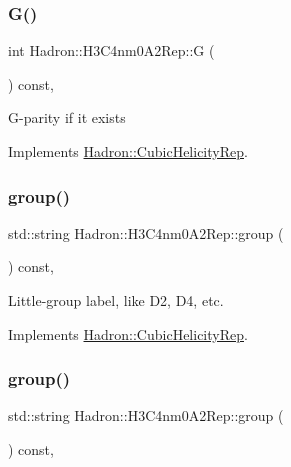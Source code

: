 \subsubsection{\texorpdfstring{G()}{G()}\hspace{0.1cm}{\footnotesize\ttfamily [3/3]}}
{\footnotesize\ttfamily int Hadron\+::\+H3\+C4nm0\+A2\+Rep\+::G (\begin{DoxyParamCaption}{ }\end{DoxyParamCaption}) const\hspace{0.3cm}{\ttfamily [inline]}, {\ttfamily [virtual]}}

G-\/parity if it exists 

Implements \mbox{\hyperlink{structHadron_1_1CubicHelicityRep_a50689f42be1e6170aa8cf6ad0597018b}{Hadron\+::\+Cubic\+Helicity\+Rep}}.

\mbox{\label{structHadron_1_1H3C4nm0A2Rep_a645f15ec66163ba3a04123eb5456f42d}} 
\subsubsection{\texorpdfstring{group()}{group()}\hspace{0.1cm}{\footnotesize\ttfamily [1/5]}}
{\footnotesize\ttfamily std\+::string Hadron\+::\+H3\+C4nm0\+A2\+Rep\+::group (\begin{DoxyParamCaption}{ }\end{DoxyParamCaption}) const\hspace{0.3cm}{\ttfamily [inline]}, {\ttfamily [virtual]}}

Little-\/group label, like D2, D4, etc. 

Implements \mbox{\hyperlink{structHadron_1_1CubicHelicityRep_a101a7d76cd8ccdad0f272db44b766113}{Hadron\+::\+Cubic\+Helicity\+Rep}}.

\mbox{\label{structHadron_1_1H3C4nm0A2Rep_a645f15ec66163ba3a04123eb5456f42d}} 
\subsubsection{\texorpdfstring{group()}{group()}\hspace{0.1cm}{\footnotesize\ttfamily [2/5]}}
{\footnotesize\ttfamily std\+::string Hadron\+::\+H3\+C4nm0\+A2\+Rep\+::group (\begin{DoxyParamCaption}{ }\end{DoxyParamCaption}) const\hspace{0.3cm}{\ttfamily [inline]}, {\ttfamily [virtual]}}


